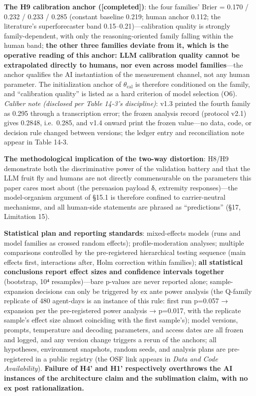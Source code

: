 \documentclass[
  11pt]{article}
\begin{document}
\textbf{The H9 calibration anchor ({[}completed{]})}: the four families'
Brier = 0.170 / 0.232 / 0.233 / 0.285 (constant baseline 0.219; human
anchor 0.112; the literature's superforecaster band
0.15--0.21)---calibration quality is strongly family-dependent, with
only the reasoning-oriented family falling within the human band;
\textbf{the other three families deviate from it, which is the operative
reading of this anchor: LLM calibration quality cannot be extrapolated
directly to humans, nor even across model families}---the anchor
qualifies the AI instantiation of the measurement channel, not any human
parameter. The initialization anchor of \(\theta_{\mathrm{cal}}\) is
therefore conditioned on the family, and ``calibration quality'' is
listed as a hard criterion of model selection (O6). \emph{Caliber note
(disclosed per Table 14-3's discipline)}: v1.3 printed the fourth family
as 0.295 through a transcription error; the frozen analysis record
(protocol v2.1) gives 0.2848, i.e.~0.285, and v1.4 onward print the
frozen value---no data, code, or decision rule changed between versions;
the ledger entry and reconciliation note appear in Table 14-3.

\textbf{The methodological implication of the two-way distortion}: H8/H9
demonstrate both the discriminative power of the validation battery and
that the LLM fruit fly and humans are not directly commensurable on the
parameters this paper cares most about (the persuasion payload δ,
extremity responses)---the model-organism argument of §15.1 is therefore
confined to carrier-neutral mechanisms, and all human-side statements
are phrased as ``predictions'' (§17, Limitation 15).

\textbf{Statistical plan and reporting standards}: mixed-effects models
(runs and model families as crossed random effects); profile-moderation
analyses; multiple comparisons controlled by the pre-registered
hierarchical testing sequence (main effects first, interactions after,
Holm correction within families); \textbf{all statistical conclusions
report effect sizes and confidence intervals together} (bootstrap, 10⁴
resamples)---bare p-values are never reported alone; sample-expansion
decisions can only be triggered by ex ante power analysis (the Q-family
replicate of 480 agent-days is an instance of this rule: first run
p=0.057 → expansion per the pre-registered power analysis → p=0.017,
with the replicate sample's effect size almost coinciding with the first
sample's); model versions, prompts, temperature and decoding parameters,
and access dates are all frozen and logged, and any version change
triggers a rerun of the anchors; all hypotheses, environment snapshots,
random seeds, and analysis plans are pre-registered in a public registry
(the OSF link appears in \emph{Data and Code Availability}).
\textbf{Failure of H4' and H1' respectively overthrows the AI instances
of the architecture claim and the sublimation claim, with no ex post
rationalization.}
\end{document}
